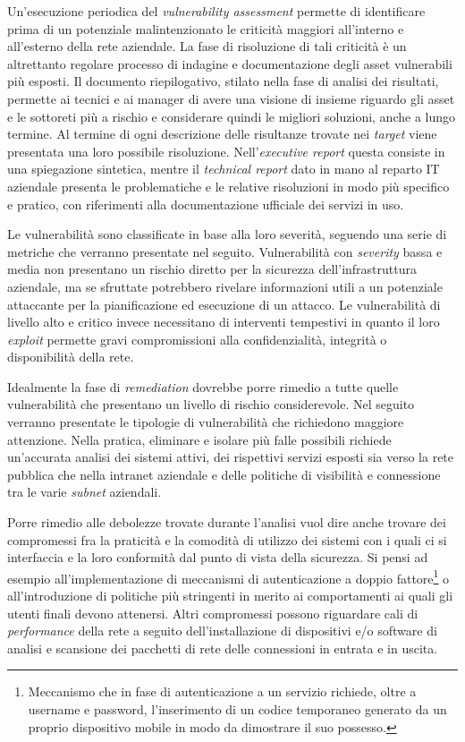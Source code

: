 \documentclass[target=bach,aauheader=]{thud}
\begin{document}
Un’esecuzione periodica del \textit{vulnerability assessment} permette di identificare prima di un potenziale malintenzionato le criticità maggiori all’interno e all’esterno della rete aziendale. La fase di risoluzione di tali criticità è un altrettanto regolare processo di indagine e documentazione degli asset vulnerabili più esposti. Il documento riepilogativo, stilato nella fase di analisi dei risultati, permette ai tecnici e ai manager di avere una visione di insieme riguardo gli asset e le sottoreti più a rischio e considerare quindi le migliori soluzioni, anche a lungo termine. Al termine di ogni descrizione delle risultanze trovate nei \textit{target} viene presentata una loro possibile risoluzione. Nell’\textit{executive report} questa consiste in una spiegazione sintetica, mentre il \textit{technical report} dato in mano al reparto IT aziendale presenta le problematiche e le relative risoluzioni in modo più specifico e pratico, con riferimenti alla documentazione ufficiale dei servizi in uso.

Le vulnerabilità sono classificate in base alla loro severità, seguendo una serie di metriche che verranno presentate nel seguito. Vulnerabilità con \textit{severity} bassa e media non presentano un rischio diretto per la sicurezza dell’infrastruttura aziendale, ma se sfruttate potrebbero rivelare informazioni utili a un potenziale attaccante per la pianificazione ed esecuzione di un attacco. Le vulnerabilità di livello alto e critico invece necessitano di interventi tempestivi in quanto il loro \textit{exploit} permette gravi compromissioni alla confidenzialità, integrità o disponibilità della rete.

Idealmente la fase di \textit{remediation} dovrebbe porre rimedio a tutte quelle vulnerabilità che presentano un livello di rischio considerevole. Nel seguito verranno presentate le tipologie di vulnerabilità che richiedono maggiore attenzione. Nella pratica, eliminare e isolare più falle possibili richiede un’accurata analisi dei sistemi attivi, dei rispettivi servizi esposti sia verso la rete pubblica che nella intranet aziendale e delle politiche di visibilità e connessione tra le varie \textit{subnet} aziendali.

Porre rimedio alle debolezze trovate durante l’analisi vuol dire anche trovare dei compromessi fra la praticità e la comodità di utilizzo dei sistemi con i quali ci si interfaccia e la loro conformità dal punto di vista della sicurezza. Si pensi ad esempio all’implementazione di meccanismi di autenticazione a doppio fattore\footnote{Meccanismo che in fase di autenticazione a un servizio richiede, oltre a username e password, l'inserimento di un codice temporaneo generato da un proprio dispositivo mobile in modo da dimostrare il suo possesso.} o all’introduzione di politiche più stringenti in merito ai comportamenti ai quali gli utenti finali devono attenersi. Altri compromessi possono riguardare cali di \textit{performance} della rete a seguito dell’installazione di dispositivi e/o software di analisi e scansione dei pacchetti di rete delle connessioni in entrata e in uscita.
\end{document}
